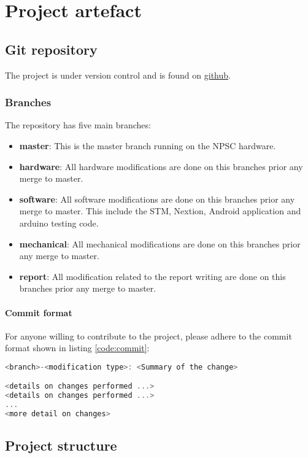 \chapter{Project artefact}


\section{Git repository}
The project is under version control and is found on \href{https://github.com/Kojey/NPSC}{github}.\\
\subsection{Branches}
The repository has five main branches: 
\begin{itemize}
	\item \textbf{master}: This is the master branch running on the NPSC hardware.
	\item \textbf{hardware}: All hardware modifications are done on this branches prior any merge to master. 
	\item \textbf{software}: All software modifications are done on this branches prior any merge to master. This include the STM, Nextion, Android application and arduino testing code. 
	\item \textbf{mechanical}: All mechanical modifications are done on this branches prior any merge to master. 
	\item \textbf{report}: All modification related to the report writing are done on this branches prior any merge to master. 
\end{itemize}

\subsubsection{Commit format}
For anyone willing to contribute to the project, please adhere to the commit format shown in listing \ref{code:commit}:\\
\begin{lstlisting}[language=C,caption=Commit format, label=code:commit]
<branch>-<modification type>: <Summary of the change>

<details on changes performed ...>
<details on changes performed ...>
...
<more detail on changes>
\end{lstlisting}

\section{Project structure}
